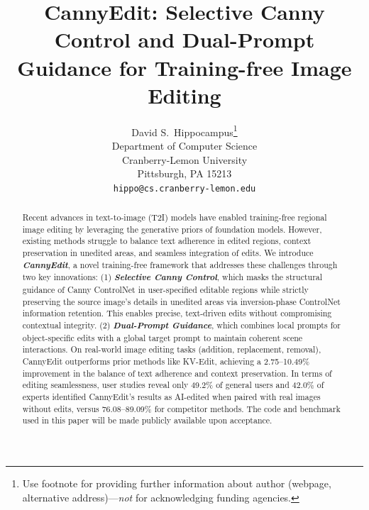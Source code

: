\documentclass{article}
\title{CannyEdit: Selective Canny Control and Dual-Prompt Guidance for Training-free Image Editing}
\author{%
  David S.~Hippocampus\thanks{Use footnote for providing further information
    about author (webpage, alternative address)---\emph{not} for acknowledging
    funding agencies.} \\
  Department of Computer Science\\
  Cranberry-Lemon University\\
  Pittsburgh, PA 15213 \\
  \texttt{hippo@cs.cranberry-lemon.edu} \\
}
\begin{document}
\maketitle


\begin{abstract}
Recent advances in text-to-image (T2I) models have enabled training-free regional image editing by leveraging the generative priors of foundation models. However, existing methods struggle to balance text adherence in edited regions, context preservation in unedited areas, and seamless integration of edits. We introduce \textbf{\textit{CannyEdit}}, a novel training-free framework that addresses these challenges through two key innovations: (1) \textbf{\textit{Selective Canny Control}}, which masks the structural guidance of Canny ControlNet in user-specified editable regions while strictly preserving the source image’s details in unedited areas via inversion-phase ControlNet information retention. This enables precise, text-driven edits without compromising contextual integrity. (2) \textbf{\textit{Dual-Prompt Guidance}}, which combines local prompts for object-specific edits with a global target prompt to maintain coherent scene interactions. On real-world image editing tasks (addition, replacement, removal), CannyEdit outperforms prior methods like KV-Edit, achieving a 2.75–10.49\% improvement in the balance of text adherence and context preservation. In terms of editing seamlessness, user studies reveal only 49.2\% of general users and 42.0\% of experts identified CannyEdit's results as AI-edited when paired with real images without edits, versus 76.08–89.09\% for competitor methods. The code and benchmark used in this paper will be made publicly available upon acceptance.
\end{abstract}
\end{document}
